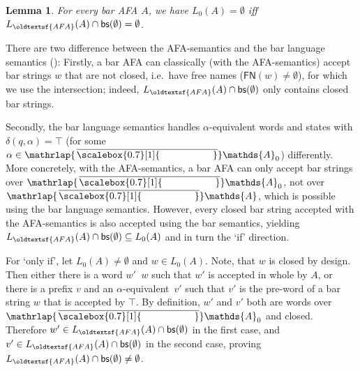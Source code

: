 \documentclass[10pt,a4paper]{amsart}
\newtheorem{lem}[theo]{Lemma}
\theoremstyle{definition}
\renewcommand{\textsf}[1]{{\oldtextsf{\small#1}}}
\newcommand{\seq}{\subseteq}
\newcommand{\At}{\mathds{A}}
\newcommand{\bars}{\mathsf{bs}}
\newcommand{\names}{\At}
\DeclareMathOperator{\alphaequiv}{\equiv_{\alpha}}
\newcommand{\mybar}[3]{%
  \mathrlap{\hspace{#2}\overline{\scalebox{#1}[1]{\phantom{\ensuremath{#3}}}}}\ensuremath{#3}
}
\newcommand{\FN}{\mathsf{FN}}
\newcommand{\barNames}{{\mybar{0.7}{1.25pt}{\names}}}
\renewcommand{\enquote}[1]{`#1'}
\begin{document}
\begin{lem}\label{lem:afaequivalence}
  For every bar AFA $A$, we have $L_0(A) = \emptyset$ iff
  $L_{\textsf{\scriptsize AFA}}(A) \cap \bars(\emptyset) = \emptyset$.
\end{lem}
\begin{IEEEproof}
  There are two difference between the AFA-semantics and the bar language semantics ():
  Firstly, a bar AFA can classically (with the AFA-semantics) accept bar strings $w$ that are not closed, i.e.~have
  free names ($\FN(w) \neq \emptyset$), for which we use the intersection; indeed, $L_{\textsf{\scriptsize AFA}}(A)
  \cap \bars(\emptyset)$ only contains closed bar strings. 
  
  Secondly, the bar language semantics handles $\alpha$-equivalent words and
  states with $\delta(q, \alpha) = \top$ (for some $\alpha \in \barNames_0$) differently.  More concretely, with the
  AFA-semantics, a bar AFA can only accept bar strings over $\barNames_0$, not over $\barNames$, which is possible
  using the bar language semantics. However, every closed bar string accepted with the AFA-semantics is also accepted
  using the bar semantics, yielding $L_{\textsf{\scriptsize AFA}}(A) \cap \bars(\emptyset) \seq L_0(A)$ and in turn the
  \enquote{if} direction.

  For \enquote{only if}, let $L_0(A) \neq \emptyset$ and $w \in L_0(A)$. Note, that $w$ is closed by design.
  Then either there is a word $w' \alphaequiv w$ such that $w'$ is accepted in whole by $A$, or there
  is a prefix $v$ and an $\alpha$-equivalent~$v'$ such that $v'$ is the pre-word of a bar string $w$ that is accepted
  by $\top$. By definition, $w'$ and $v'$ both are words over $\barNames_0$ and closed.
  Therefore $w' \in L_{\textsf{\scriptsize AFA}}(A) \cap \bars(\emptyset)$ in the first case, and
  $v' \in L_{\textsf{\scriptsize AFA}}(A) \cap \bars(\emptyset)$ in the second case, proving
  $L_{\textsf{\scriptsize AFA}}(A) \cap \bars(\emptyset) \neq \emptyset$.
\end{IEEEproof}
\end{document}
